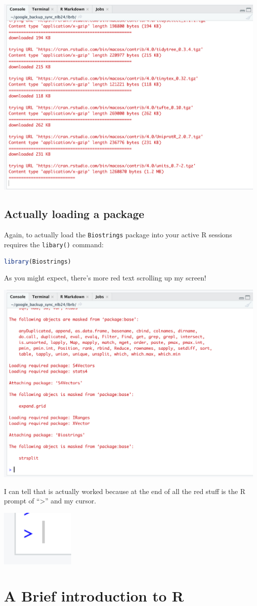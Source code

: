 \documentclass[
]{book}
\newcommand{\passthrough}[1]{#1}
\begin{document}
\includegraphics[width=0.4\linewidth]{images/angry_red_text_download_biostrings}

\hypertarget{actually-loading-a-package}{%
\section{Actually loading a package}\label{actually-loading-a-package}}

Again, to actually load the \passthrough{\lstinline!Biostrings!} package into your active R sessions requires the \passthrough{\lstinline!libary()!} command:

\begin{lstlisting}[language=R]
library(Biostrings)
\end{lstlisting}

As you might expect, there's more red text scrolling up my screen!

\includegraphics[width=0.4\linewidth]{images/angry_red_text_library_biostrings}

I can tell that is actually worked because at the end of all the red stuff is the R prompt of ``\textgreater{}'' and my cursor.

\includegraphics[width=1.42in]{images/R_cursor}

\hypertarget{basic-R}{%
\chapter{A Brief introduction to R}\label{basic-R}}
\end{document}
